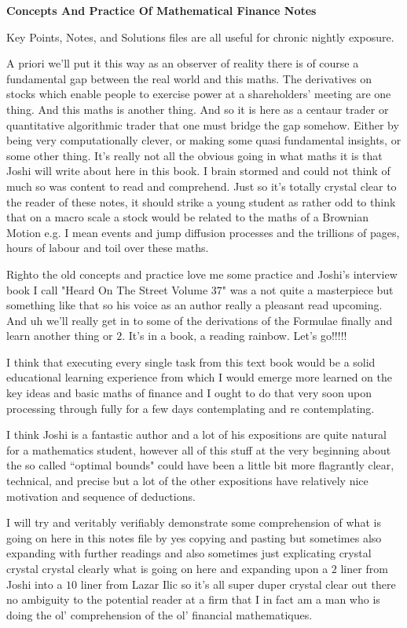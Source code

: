 \Large
\twocolumn

\textbf{Concepts And Practice Of Mathematical Finance Notes}

Key Points, Notes, and Solutions files are all useful for chronic nightly exposure.

A priori we'll put it this way as an observer of reality there is of course a fundamental gap between the real world and this maths. The derivatives on stocks which enable people to exercise power at a shareholders' meeting are one thing. And this maths is another thing. And so it is here as a centaur trader or quantitative algorithmic trader that one must bridge the gap somehow. Either by being very computationally clever, or making some quasi fundamental insights, or some other thing. It's really not all the obvious going in what maths it is that Joshi will write about here in this book. I brain stormed and could not think of much so was content to read and comprehend. Just so it's totally crystal clear to the reader of these notes, it should strike a young student as rather odd to think that on a macro scale a stock would be related to the maths of a Brownian Motion e.g. I mean events and jump diffusion processes and the trillions of pages, hours of labour and toil over these maths.

Righto the old concepts and practice love me some practice and Joshi's interview book I call "Heard On The Street Volume $37$" was a not quite a masterpiece but something like that so his voice as an author really a pleasant read upcoming. And uh we'll really get in to some of the derivations of the Formulae finally and learn another thing or $2$. It's in a book, a reading rainbow. Let's go!!!!!

I think that executing every single task from this text book would be a solid educational learning experience from which I would emerge more learned on the key ideas and basic maths of finance and I ought to do that very soon upon processing through fully for a few days contemplating and re contemplating.

I think Joshi is a fantastic author and a lot of his expositions are quite natural for a mathematics student, however all of this stuff at the very beginning about the so called ``optimal bounds" could have been a little bit more flagrantly clear, technical, and precise but a lot of the other expositions have relatively nice motivation and sequence of deductions.

I will try and veritably verifiably demonstrate some comprehension of what is going on here in this notes file by yes copying and pasting but sometimes also expanding with further readings and also sometimes just explicating crystal crystal crystal clearly what is going on here and expanding upon a $2$ liner from Joshi into a $10$ liner from Lazar Ilic so it's all super duper crystal clear out there no ambiguity to the potential reader at a firm that I in fact am a man who is doing the ol' comprehension of the ol' financial mathematiques.

